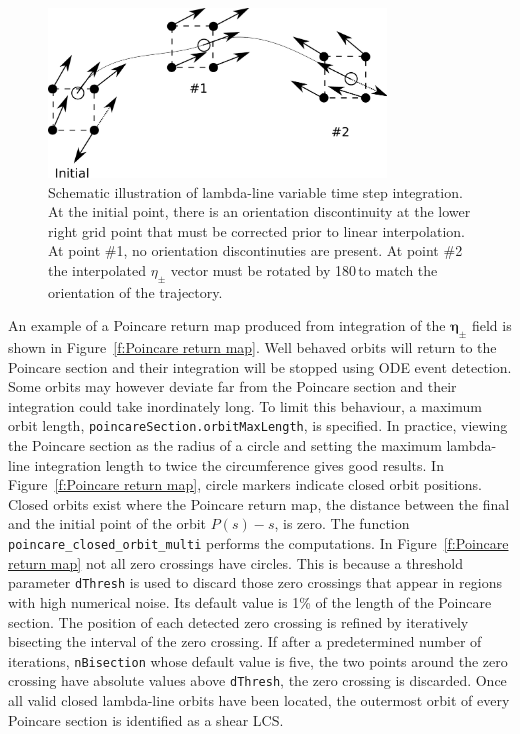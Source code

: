 \documentclass{article}
\begin{document}
\begin{figure}
\begin{center}
\includegraphics[width=0.8\textwidth]{graphics/variable_step_integration}
\end{center}
\caption{Schematic illustration of lambda-line variable time step integration. At the initial point, there is an orientation discontinuity at the lower right grid point that must be corrected prior to linear interpolation. At point \#1, no orientation discontinuties are present. At point \#2 the interpolated $\eta_\pm$ vector must be rotated by 180\degree\,to match the orientation of the trajectory.}
\label{f:variable step integration}
\end{figure}

An example of a Poincare return map produced from integration of the $\boldsymbol \eta_\pm$ field is shown in Figure~\ref{f:Poincare return map}. Well behaved orbits will return to the Poincare section and their integration will be stopped using ODE event detection. Some orbits may however deviate far from the Poincare section and their integration could take inordinately long. To limit this behaviour, a maximum orbit length, \lstinline!poincareSection.orbitMaxLength!, is specified. In practice, viewing the Poincare section as the radius of a circle and setting the maximum lambda-line integration length to twice the circumference gives good results. In Figure~\ref{f:Poincare return map}, circle markers indicate closed orbit positions. Closed orbits exist where the Poincare return map, the distance between the final and the initial point of the orbit $P(s)-s$, is zero. The function \lstinline!poincare_closed_orbit_multi! performs the computations. In Figure~\ref{f:Poincare return map} not all zero crossings have circles. This is because a threshold parameter \lstinline!dThresh! is used to discard those zero crossings that appear in regions with high numerical noise. Its default value is 1\% of the length of the Poincare section. The position of each detected zero crossing is refined by iteratively bisecting the interval of the zero crossing. If after a predetermined number of iterations, \lstinline!nBisection! whose default value is five, the two points around the zero crossing have absolute values above \lstinline!dThresh!, the zero crossing is discarded. Once all valid closed lambda-line orbits have been located, the outermost orbit of every Poincare section is identified as a shear LCS.
\end{document}

